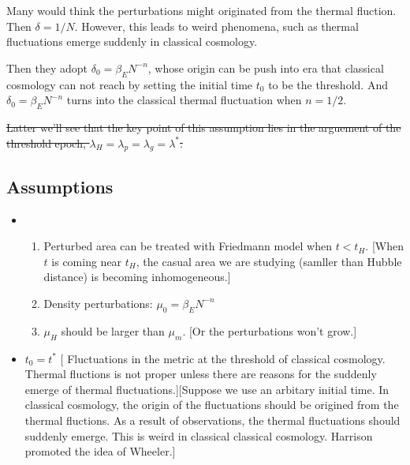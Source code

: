 Many would think the perturbations might originated from the thermal fluction. Then $\delta=1/N$. However, this leads to weird phenomena, such as thermal fluctuations emerge suddenly in classical cosmology.

Then they adopt $\delta_0=\beta_E N^{-n}$, whose origin can be push into era that classical cosmology can not reach by setting the initial time $t_0$ to be the threshold. And $\delta_0=\beta_E N^{-n}$ turns into the classical thermal fluctuation when $n=1/2$.

\sout{Latter we'll see that the key point of this assumption lies in the arguement of the threshold epoch, $\lambda_H=\lambda_p=\lambda_g =\lambda^*$.
}






\subsection{Assumptions}

\begin{itemize}




\item
\begin{enumerate}

\item Perturbed area can be treated with Friedmann model when $t<t_H$. [When $t$ is coming near $t_H$, the casual area we are studying (samller than Hubble distance) is becoming inhomogeneous.]

\item Density perturbations: $\mu_0=\beta_E N^{-n}$

\item $\mu_H$ should be larger than $\mu_m$. [Or the perturbations won't grow.]

\end{enumerate}

\item
$t_0=t^*$ [
Fluctuations in the metric at the threshold of classical cosmology. Thermal fluctions is not proper unless there are reasons for the suddenly emerge of thermal fluctuations.][Suppose we use an arbitary initial time. In classical cosmology, the origin of the fluctuations should be origined from the thermal fluctions. As a result of observations, the thermal fluctuations should suddenly emerge. This is weird in classical classical cosmology. Harrison promoted the idea of Wheeler.]


\end{itemize}




